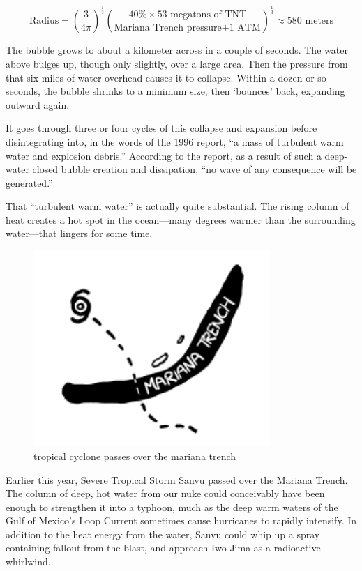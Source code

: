 {\[\text{Radius} =\left (\frac{3}{4\pi}\right)^\frac{1}{3}\left (\frac{40\%\times 53\text{ megatons of TNT}}{\text{Mariana Trench pressure}+\text{1 ATM}}\right)^\frac{1}{3}\approx580\text{ meters}\]}

{The bubble grows to about a kilometer across in a couple of seconds. The water above bulges up, though only slightly, over a large area. Then the pressure from that six miles of water overhead causes it to collapse. Within a dozen or so seconds, the bubble shrinks to a minimum size, then ‘bounces’ back, expanding outward again.}

{It goes through three or four cycles of this collapse and expansion before disintegrating into, in the words of the 1996 report, “a mass of turbulent warm water and explosion debris.” According to the report, as a result of such a deep-water closed bubble creation and dissipation, “no wave of any consequence will be generated.”}

{That “turbulent warm water” is actually quite substantial. The rising column of heat creates a hot spot in the ocean—many degrees warmer than the surrounding water—that lingers for some time.}

\begin{figure}[!htbp]
\centering
\includegraphics[scale=0.5, max width=0.8\textwidth]{imgs/a/15/mariana_sanvu.png}
\caption{tropical cyclone passes over the mariana trench}
\end{figure}

{Earlier this year, Severe Tropical Storm Sanvu passed over the Mariana Trench. The column of deep, hot water from our nuke could conceivably have been enough to strengthen it into a typhoon, much as the deep warm waters of the Gulf of Mexico’s Loop Current sometimes cause hurricanes to rapidly intensify. In addition to the heat energy from the water, Sanvu could whip up a spray containing fallout from the blast, and approach Iwo Jima as a radioactive whirlwind.}

